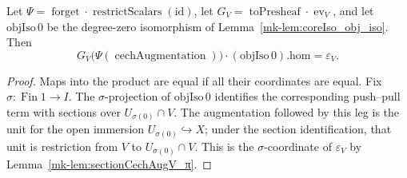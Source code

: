 \begin{lemma}\label{mk-lem:mappedSectionCechAugV_eq}
  \leanok

  Let \(\Psi=\operatorname{forget}\cdot\operatorname{restrictScalars}(\mathrm{id})\), let
  \(G_V=\operatorname{toPresheaf}\cdot\operatorname{ev}_V\), and let
  \(\mathrm{objIso}\,0\) be the degree-zero isomorphism of
  Lemma~\ref{mk-lem:coreIso_obj_iso}. Then
  \[
    G_V\bigl(\Psi(\operatorname{cechAugmentation})\bigr)
      \cdot (\mathrm{objIso}\,0).\mathrm{hom}=\varepsilon_V.
  \]
\end{lemma}
\begin{proof}
  \leanok
  Maps into the product are equal if all their coordinates are equal. Fix
  \(\sigma:\operatorname{Fin}1\to I\). The \(\sigma\)-projection of
  \(\mathrm{objIso}\,0\) identifies the corresponding push--pull term with sections over
  \(U_{\sigma(0)}\cap V\). The augmentation followed by this leg is the unit for the open
  immersion \(U_{\sigma(0)}\hookrightarrow X\); under the section identification, that unit is
  restriction from \(V\) to \(U_{\sigma(0)}\cap V\). This is the \(\sigma\)-coordinate of
  \(\varepsilon_V\) by Lemma~\ref{mk-lem:sectionCechAugV_π}.
\end{proof}

